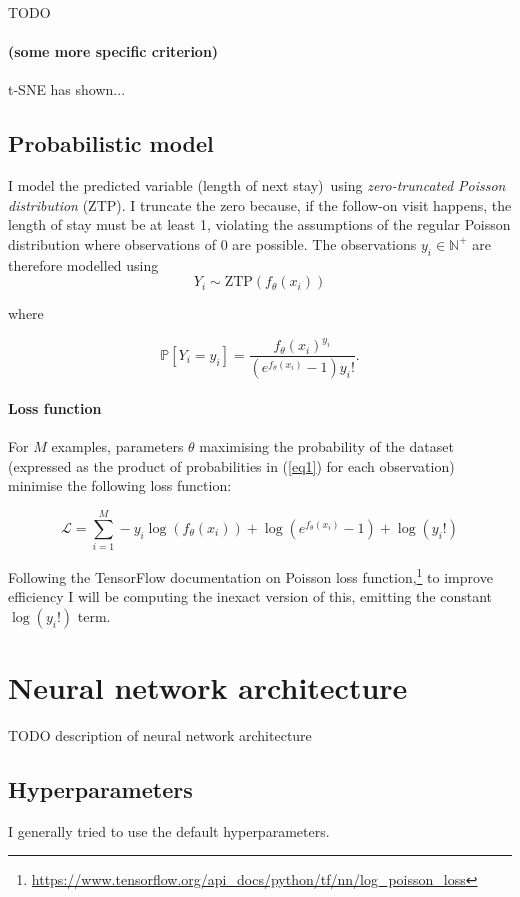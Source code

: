 \documentclass[10pt, twocolumn]{article}
\begin{document}
TODO \paragraph{(some more specific criterion)} t-SNE has shown...


\subsection{Probabilistic model}

I model the predicted variable (length of next stay) using \textit{zero-truncated Poisson distribution} (ZTP). I truncate the zero because, if the follow-on visit happens, the length of stay must be at least 1, violating the assumptions of the regular Poisson distribution where observations of 0 are possible. The observations $y_i \in \mathbb{N}^+$ are therefore modelled using \[Y_i \sim \mathrm{ZTP}(f_\theta(x_i))\]

where 

\begin{equation}
	\mathbb{P}[Y_i = y_i] = \frac{f_\theta(x_i)^{y_i}}{(e^{f_\theta(x_i)} - 1)y_i!}.
	\label{eq1}
\end{equation}

\paragraph{Loss function} For $M$ examples, parameters $\theta$ maximising the probability of the dataset (expressed as the product of probabilities in (\ref{eq1}) for each observation) minimise the following loss function:

\begin{equation}
	\mathcal{L} = \sum\limits_{i=1}^{M} -y_i \log(f_\theta(x_i)) + \log(e^{f_\theta(x_i)} - 1) + \log(y_i!)
\end{equation}

Following the TensorFlow documentation on Poisson loss function,\footnote{\url{https://www.tensorflow.org/api_docs/python/tf/nn/log_poisson_loss}} to improve efficiency I will be computing the inexact version of this, emitting the constant $\log(y_i!)$ term.


\section{Neural network architecture}

TODO description of neural network architecture


\subsection{Hyperparameters}
I generally tried to use the default hyperparameters. 
\end{document}
